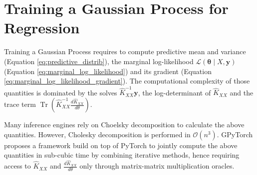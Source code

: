 \documentclass{article}
\newcommand{\vect}[1]{\boldsymbol{\mathbf{#1}}}
\DeclareMathOperator{\trace}{Tr}
\begin{document}

\section{Training a Gaussian Process for Regression}

Training a Gaussian Process requires to compute predictive mean and variance (Equation \eqref{eq:predictive_distrib}), the marginal log-likelihood $\mathcal L(\vect \theta \mid X, \vect y)$ (Equation \eqref{eq:marginal_log_likelihood}) and its gradient (Equation \eqref{eq:marginal_log_likelihood_gradient}). The computational complexity of those quantities is dominated by the solves $\widehat K_{XX}^{-1} \vect y$, the log-determinant of $\hat K_{XX}$ and the trace term $\trace ( \widehat K_{XX}^{-1} \frac{d \widehat K_{XX}}{d\theta} )$. 

Many inference engines \cite{} rely on Choelsky decomposition to calculate the above quantities. However, Cholesky decomposition is performed in $\mathcal O(n^3)$. GPyTorch \cite{gardner_gpytorch_2021} proposes a framework build on top of PyTorch to jointly compute the above quantities in sub-cubic time by combining iterative methods, hence requiring access to $\widehat K_{XX}$ and $\frac{d \widehat K_{XX}}{d\theta}$ only through matrix-matrix multiplication oracles. 
\end{document}
